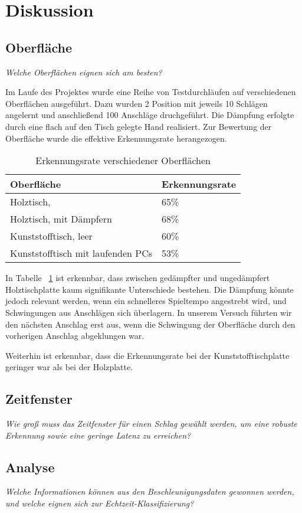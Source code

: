 \section{Diskussion}

\subsection*{Oberfläche}
\textit{Welche Oberflächen eignen sich am besten?}

Im Laufe des Projektes wurde eine Reihe von Testdurchläufen auf verschiedenen Oberflächen ausgeführt. Dazu wurden 2 Position mit jeweils 10 Schlägen angelernt und anschließend 100 Anschläge druchgeführt. Die Dämpfung erfolgte durch eine flach auf den Tisch gelegte Hand realisiert. Zur Bewertung der Oberfläche wurde die effektive Erkennungsrate herangezogen.


\begin{table}[h]   
	\centering
     
     \caption{Erkennungsrate verschiedener Oberflächen}
     \label{tab:surf}
\begin{tabular}{l l}
Oberfläche & Erkennungsrate \\
\hline
Holztisch, & 65\% \\
Holztisch, mit Dämpfern & 68\% \\
Kunststofftisch, leer & 60\% \\
Kunststofftisch mit laufenden PCs & 53\% \\

\end{tabular}
\end{table}



In Tabelle ~\ref{tab:surf} ist erkennbar, dass zwischen gedämpfter und ungedämpfert Holztischplatte kaum signifikante Unterschiede bestehen. Die Dämpfung könnte jedoch relevant werden, wenn ein schnelleres Spieltempo angestrebt wird, und Schwingungen aus Anschlägen sich überlagern. In unserem Versuch führten wir den nächsten Anschlag erst aus, wenn die Schwingung der Oberfläche durch den vorherigen Anschlag abgeklungen war.

Weiterhin ist erkennbar, dass die Erkennungsrate bei der Kunststofftischplatte geringer war als bei der Holzplatte.


\subsection*{Zeitfenster}
\textit{Wie groß muss das Zeitfenster für einen Schlag gewählt werden, um eine robuste Erkennung sowie eine geringe Latenz zu erreichen?}



\subsection*{Analyse}
\textit{Welche Informationen können aus den Beschleunigungsdaten gewonnen werden, und welche eignen sich zur Echtzeit-Klassifizierung?}


